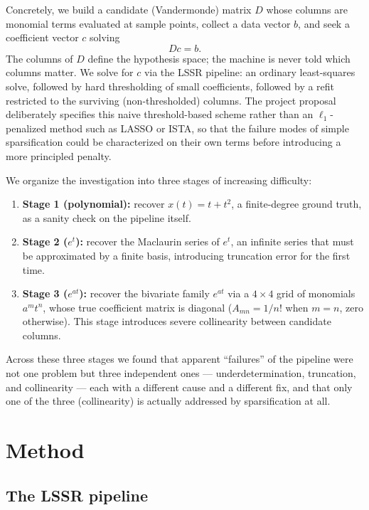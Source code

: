 \documentclass[11pt]{article}
\begin{document}
Concretely, we build a candidate (Vandermonde) matrix $D$ whose columns are monomial
terms evaluated at sample points, collect a data vector $b$, and seek a coefficient
vector $c$ solving
\begin{equation}
D c = b.
\label{eq:dcb}
\end{equation}
The columns of $D$ define the hypothesis space; the machine is never told which columns
matter. We solve for $c$ via the LSSR pipeline: an ordinary least-squares solve, followed
by hard thresholding of small coefficients, followed by a refit restricted to the
surviving (non-thresholded) columns. The project proposal deliberately specifies this
naive threshold-based scheme rather than an $\ell_1$-penalized method such as LASSO or
ISTA, so that the failure modes of simple sparsification could be characterized on their
own terms before introducing a more principled penalty.

We organize the investigation into three stages of increasing difficulty:

\begin{enumerate}
  \item \textbf{Stage 1 (polynomial):} recover $x(t) = t + t^2$, a finite-degree
  ground truth, as a sanity check on the pipeline itself.
  \item \textbf{Stage 2 ($e^{t}$):} recover the Maclaurin series of $e^{t}$, an
  infinite series that must be approximated by a finite basis, introducing truncation
  error for the first time.
  \item \textbf{Stage 3 ($e^{at}$):} recover the bivariate family $e^{at}$ via a
  $4\times 4$ grid of monomials $a^m t^n$, whose true coefficient matrix is diagonal
  ($A_{mn} = 1/n!$ when $m=n$, zero otherwise). This stage introduces severe collinearity
  between candidate columns.
\end{enumerate}

Across these three stages we found that apparent ``failures'' of the pipeline were not
one problem but three independent ones --- underdetermination, truncation, and
collinearity --- each with a different cause and a different fix, and that only one of
the three (collinearity) is actually addressed by sparsification at all.

\section{Method}

\subsection{The LSSR pipeline}
\end{document}
